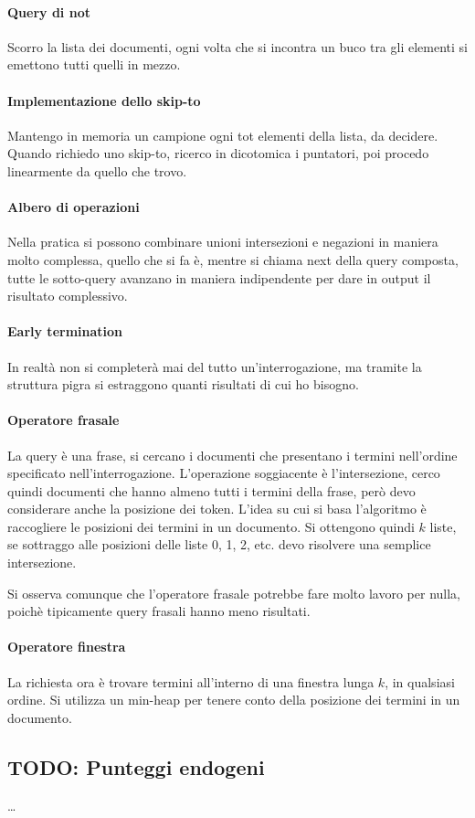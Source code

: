 \paragraph{Query di not}
Scorro la lista dei documenti, ogni volta che si incontra un buco tra gli 
elementi si emettono tutti quelli in mezzo.

\paragraph{Implementazione dello skip-to}
Mantengo in memoria un campione ogni tot elementi della lista, da decidere. 
Quando richiedo uno skip-to, ricerco in dicotomica i puntatori, poi procedo 
linearmente da quello che trovo.

\paragraph{Albero di operazioni}
Nella pratica si possono combinare unioni intersezioni e negazioni in maniera molto 
complessa, quello che si fa è, mentre si chiama next della query composta, 
tutte le sotto-query avanzano in maniera indipendente per dare in output il 
risultato complessivo.

\paragraph{Early termination}
In realtà non si completerà mai del tutto un'interrogazione, ma tramite la struttura
pigra si estraggono quanti risultati di cui ho bisogno.

\paragraph{Operatore frasale}
La query è una frase, si cercano i documenti che presentano i termini nell'ordine specificato nell'interrogazione.
L'operazione soggiacente è l'intersezione, cerco quindi documenti che hanno 
almeno tutti i termini della frase, però devo considerare anche 
la posizione dei token.
L'idea su cui si basa l'algoritmo è raccogliere le posizioni dei termini 
in un documento. 
Si ottengono quindi $k$ liste, se sottraggo alle posizioni delle liste 0, 1, 2, etc. devo risolvere una semplice intersezione. 

Si osserva comunque che l'operatore frasale potrebbe fare molto lavoro
per nulla, poichè tipicamente query frasali hanno meno risultati.

\paragraph{Operatore finestra}
La richiesta ora è trovare termini all'interno di una finestra lunga $k$, 
in qualsiasi ordine.
Si utilizza un min-heap per tenere conto della posizione dei termini 
in un documento. 

\subsection{TODO: Punteggi endogeni}
\dots

